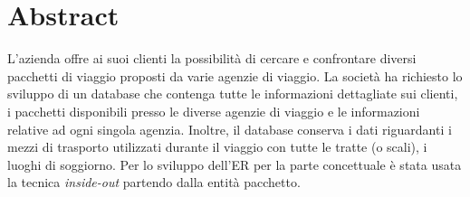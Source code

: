 \section{Abstract}
L'azienda \company offre ai suoi clienti la possibilità di cercare e confrontare diversi pacchetti di viaggio proposti da varie agenzie di viaggio. La società ha richiesto lo sviluppo di un database che contenga tutte le informazioni dettagliate sui clienti, i pacchetti disponibili presso le diverse agenzie di viaggio e le informazioni relative ad ogni singola agenzia. Inoltre, il database conserva i dati riguardanti i mezzi di trasporto utilizzati durante il viaggio con tutte le tratte (o scali), i luoghi di soggiorno.
Per lo sviluppo dell'ER per la parte concettuale è stata usata la tecnica \emph{inside-out} partendo dalla entità pacchetto.